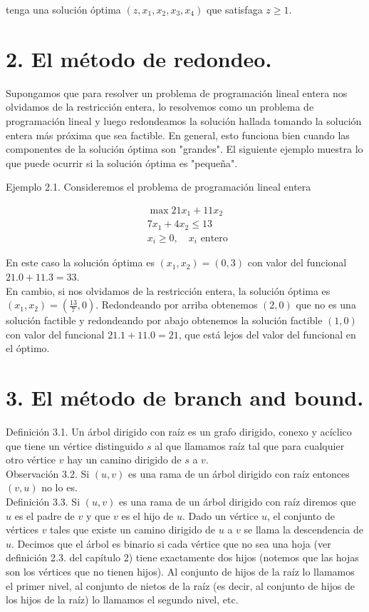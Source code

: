 \documentclass[10pt]{article}
\begin{document}
tenga una solución óptima $\left(z, x_{1}, x_{2}, x_{3}, x_{4}\right)$ que satisfaga $z \geq 1$.

\section*{2. El método de redondeo.}
Supongamos que para resolver un problema de programación lineal entera nos olvidamos de la restricción entera, lo resolvemos como un problema de programación lineal y luego redondeamos la solución hallada tomando la solución entera más próxima que sea factible. En general, esto funciona bien cuando las componentes de la solución óptima son "grandes". El siguiente ejemplo muestra lo que puede ocurrir si la solución óptima es "pequeña".

Ejemplo 2.1. Consideremos el problema de programación lineal entera

$$
\begin{aligned}
& \max 21 x_{1}+11 x_{2} \\
& 7 x_{1}+4 x_{2} \leq 13 \\
& x_{i} \geq 0, \quad x_{i} \text { entero }
\end{aligned}
$$

En este caso la solución óptima es $\left(x_{1}, x_{2}\right)=(0,3)$ con valor del funcional $21.0+11.3=33$.\\
En cambio, si nos olvidamos de la restricción entera, la solución óptima es $\left(x_{1}, x_{2}\right)=\left(\frac{13}{7}, 0\right)$. Redondeando por arriba obtenemos $(2,0)$ que no es una solución factible y redondeando por abajo obtenemos la solución factible $(1,0)$ con valor del funcional $21.1+11.0=21$, que está lejos del valor del funcional en el óptimo.

\section*{3. El método de branch and bound.}
Definición 3.1. Un árbol dirigido con raíz es un grafo dirigido, conexo y acíclico que tiene un vértice distinguido $s$ al que llamamos raíz tal que para cualquier otro vértice $v$ hay un camino dirigido de $s$ a $v$.\\
Observación 3.2. Si $(u, v)$ es una rama de un árbol dirigido con raíz entonces $(v, u)$ no lo es.\\
Definición 3.3. Si $(u, v)$ es una rama de un árbol dirigido con raíz diremos que $u$ es el padre de $v$ y que $v$ es el hijo de $u$. Dado un vértice $u$, el conjunto de vértices $v$ tales que existe un camino dirigido de $u$ a $v$ se llama la descendencia de $u$. Decimos que el árbol es binario si cada vértice que no sea una hoja (ver definición 2.3. del capítulo 2) tiene exactamente dos hijos (notemos que las hojas son los vértices que no tienen hijos). Al conjunto de hijos de la raíz lo llamamos el primer nivel, al conjunto de nietos de la raíz (es decir, al conjunto de hijos de los hijos de la raíz) lo llamamos el segundo nivel, etc.
\end{document}
